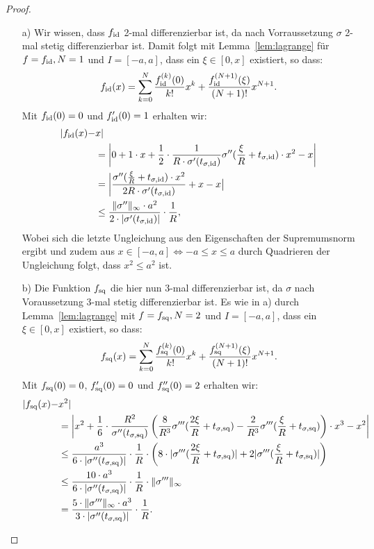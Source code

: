 \begin{proof}
	\begin{itemize}
  	\item[a)] Wir wissen, dass $f_{\mathrm{id}}$ 2-mal differenzierbar ist, da nach Vorraussetzung $\sigma$ 2-mal stetig differenzierbar ist. Damit folgt mit Lemma~\ref{lem:lagrange} für $f = f_{\mathrm{id}}, N = 1$ und $I = [-a, a]$, dass ein $\xi \in [0, x]$ existiert, so dass:
$$f_{\mathrm{id}}(x) = \sum_{k = 0}^N \frac{f_{\mathrm{id}}^{(k)}(0)}{k!}x^k + \frac{f_{\mathrm{id}}^{(N + 1)}(\xi)}{(N + 1)!}x^{N + 1}.$$
Mit $f_{\mathrm{id}}(0) = 0$ und $f_{\mathrm{id}}'(0) = 1$ erhalten wir:
  	\begin{equation*}
  	\begin{split}
  	 |f_{\mathrm{id}}(x) -  & x| \\
  	& = \bigg|0 + 1 \cdot x + \frac{1}{2} \cdot \frac{1}{R \cdot \sigma'(t_{\sigma,\mathrm{id}})} \sigma''(\frac{\xi}{R} + t_{\sigma,\mathrm{id}}) \cdot x^2 - x \bigg| \\
  	& = \bigg| \frac{\sigma''(\frac{\xi}{R} + t_{\sigma,\mathrm{id}})  \cdot x^2}{2R \cdot \sigma'(t_{\sigma, \mathrm{id}})} + x - x\big| \\
  	& \leq \frac{\| \sigma'' \|_{\infty} \cdot a^2}{2 \cdot |\sigma'(t_{\sigma, \mathrm{id}})|} \cdot \frac{1}{R},  
  	\end{split}
  	\end{equation*}
  	Wobei sich die letzte Ungleichung aus den Eigenschaften der Supremumsnorm ergibt und zudem aus $x \in [-a,a] \Leftrightarrow -a \leq x \leq a$ durch Quadrieren der Ungleichung folgt, dass $x^2 \leq a^2$ ist.
  	\item[b)]  Die Funktion $f_{\mathrm{sq}}$ die hier nun 3-mal differenzierbar ist, da $\sigma$ nach Voraussetzung  3-mal stetig differenzierbar ist. Es wie in a) durch Lemma~\ref{lem:lagrange} mit $f = f_{\mathrm{sq}}, N = 2$ und $I = [-a, a]$, dass ein $\xi \in [0, x]$ existiert, so dass:
$$f_{\mathrm{sq}}(x) = \sum_{k = 0}^N \frac{f_{\mathrm{sq}}^{(k)}(0)}{k!}x^k + \frac{f_{\mathrm{sq}}^{(N + 1)}(\xi)}{(N + 1)!}x^{N + 1}.$$
Mit $f_{\mathrm{sq}}(0) = 0$, $f_{\mathrm{sq}}'(0) = 0$ und $f_{\mathrm{sq}}''(0) = 2$ erhalten wir:
\begin{equation*}
  	\begin{split}
  	 |f_{\mathrm{sq}}(x) -  & x^2| \\
  	& = \bigg|x^2 + \frac{1}{6} \cdot \frac{R^2}{\sigma''(t_{\sigma,\mathrm{sq}})} \left(\frac{8}{R^3}\sigma'''(\frac{2\xi}{R} + t_{\sigma,\mathrm{sq}}) - \frac{2}{R^3} \sigma'''(\frac{\xi}{R} + t_{\sigma,\mathrm{sq}})\right) \cdot x^3 - x^2\bigg| \\
  	& \leq \frac{a^3}{6 \cdot |\sigma''(t_{\sigma,\mathrm{sq}})|} \cdot \frac{1}{R} \cdot \left(8 \cdot |\sigma'''(\frac{2\xi}{R} + t_{\sigma,\mathrm{sq}})| + 2 |\sigma'''(\frac{\xi}{R} + t_{\sigma,\mathrm{sq}})|\right) \\
  	& \leq \frac{10 \cdot a^3}{6 \cdot |\sigma''(t_{\sigma,\mathrm{sq}})|} \cdot \frac{1}{R} \cdot \|\sigma'''\|_{\infty} \\
  	& = \frac{5 \cdot \|\sigma'''\|_{\infty} \cdot a^3}{3 \cdot |\sigma''(t_{\sigma, \mathrm{sq}})|} \cdot \frac{1}{R}. 
  	\end{split}
  	\end{equation*}
 	\end{itemize}
\end{proof}

